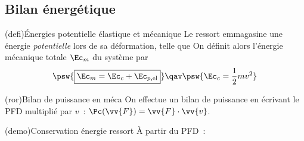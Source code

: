 \documentclass[../../main/main.tex]{subfiles}
\begin{document}
\subsection{Bilan énergétique}

\begin{tcb*}[label=def:emeca, sidebyside,
		list entry={\lte\thedefi~:~Énergies d'un ressort}]
	(defi){Énergies potentielle élastique et mécanique}
	Le ressort emmagasine une énergie \textit{potentielle} lors de sa
	déformation, telle que
	\psw{%
		\[
			\boxed{
				\Ec_{p\rm, el} = \frac{1}{2}k(\ell-\ell_0)^2 = \frac{1}{2}kx^2
			}%
		\]
	}%
	\tcblower
	On définit alors l'énergie mécanique totale $\Ec_m$ du système par
	\[
		\psw{%
			\boxed{\Ec_m = \Ec_c + \Ec_{p\rm, el}}
		}%
		\qav
		\psw{%
			\Ec_c = \frac{1}{2}mv^2
		}%
	\]
\end{tcb*}

\begin{tcb}[fontupper=\Large, bld, cnt](ror){Bilan de puissance en méca}
	On effectue un bilan de puissance en écrivant le PFD multiplié par $v$~:
	$\Pc(\vv{F}) = \vv{F}\cdot \vv{v}$.
\end{tcb}

\begin{tcb*}[label=demo:emecacons](demo){Conservation énergie ressort}
	À partir du PFD~:
	\vspace{-15pt}
	\vspace{-15pt}
\end{tcb*}
\end{document}
